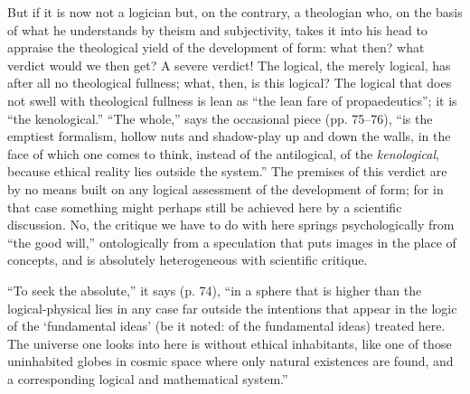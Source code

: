 \documentclass[12pt]{book}
\newcommand{\opage}[1]{\marginnote{\footnotesize\textit{[#1]}}}
\begin{document}
But if it is now not a logician but, on the contrary, a theologian who, on the basis of what he understands by theism and subjectivity, takes it into his head to appraise the theological yield of the development of form: what then? what verdict would we then get? A severe verdict! The logical, the merely logical, has after all no theological fullness; what, then, is this logical? The logical that does not swell with theological fullness is lean as ``the lean fare of propaedeutics''; it is ``the kenological.'' ``The whole,'' says the occasional piece (pp. 75--76), ``is the emptiest formalism, hollow nuts and shadow-play up and down the walls, in the face of which one comes to think, instead of the antilogical, of the \emph{kenological}, because ethical reality lies outside the system.'' The premises of this verdict are by no means built on any logical assessment of the development of form; for in that case something might perhaps still be achieved here by a scientific discussion. No, the critique we have to do with here springs psychologically from ``the good will,'' ontologically from a speculation that puts images in the place of concepts, and is absolutely heterogeneous with scientific critique.

``To seek the absolute,'' it says (p. 74), ``in a sphere that is higher than the logical-physical lies in any case far outside the intentions that appear in the logic of the `fundamental ideas' (be it noted: of the fundamental ideas) treated here. The universe one looks into here is without ethical inhabitants, like one of those uninhabited globes in
\opage{130}\setcounter{footnote}{0}%
cosmic space where only natural existences are found, and a corresponding logical and mathematical system.''
\end{document}
